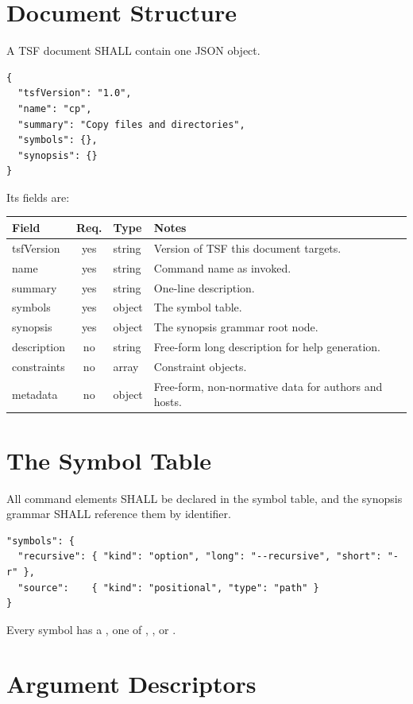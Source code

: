 \section{Document Structure}

A TSF document SHALL contain one JSON object.

\begin{lstlisting}
{
  "tsfVersion": "1.0",
  "name": "cp",
  "summary": "Copy files and directories",
  "symbols": {},
  "synopsis": {}
}
\end{lstlisting}

Its fields are:

\begin{tabulary}{\textwidth}{lclL}
Field & Req. & Type & Notes \\
\hline
tsfVersion  & yes & string & Version of TSF this document targets. \\
name        & yes & string & Command name as invoked. \\
summary     & yes & string & One-line description. \\
symbols     & yes & object & The symbol table. \\
synopsis    & yes & object & The synopsis grammar root node. \\
description & no  & string & Free-form long description for help generation. \\
constraints & no  & array  & Constraint objects. \\
metadata    & no  & object & Free-form, non-normative data for authors and hosts. \\
\end{tabulary}

\section{The Symbol Table}

All command elements SHALL be declared in the symbol table, and the synopsis grammar SHALL reference them by identifier.

\begin{lstlisting}
"symbols": {
  "recursive": { "kind": "option", "long": "--recursive", "short": "-r" },
  "source":    { "kind": "positional", "type": "path" }
}
\end{lstlisting}

Every symbol has a , one of , ,  or .

\section{Argument Descriptors}

